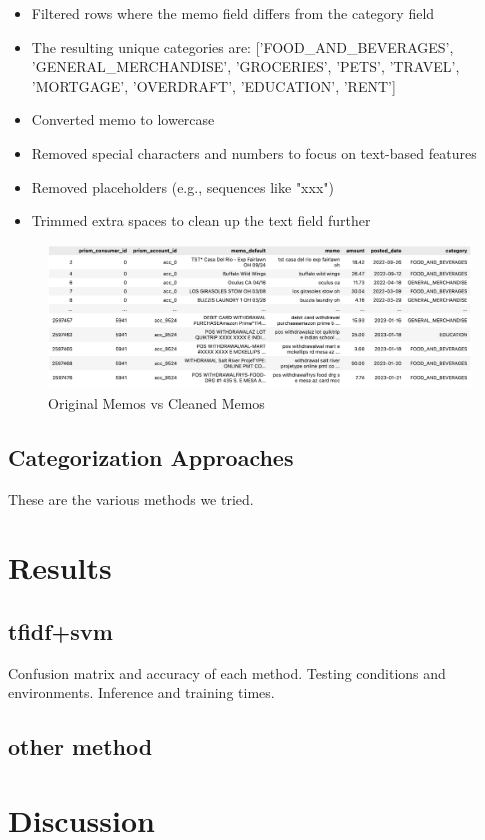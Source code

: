 \documentclass[12pt,letterpaper]{article}
\begin{document}
\begin{itemize}
    \item Filtered rows where the memo field differs from the category field 
    \item The resulting unique categories are: ['FOOD\_AND\_BEVERAGES', 'GENERAL\_MERCHANDISE', 'GROCERIES', 'PETS', 'TRAVEL', 'MORTGAGE', 'OVERDRAFT', 'EDUCATION', 'RENT']
    \item Converted memo to lowercase
    \item Removed special characters and numbers to focus on text-based features
    \item Removed placeholders (e.g., sequences like "xxx")
    \item Trimmed extra spaces to clean up the text field further
\end{itemize}
\begin{figure}[H]
    \centering
    \includegraphics[width=1.0\textwidth]{pngs/memo_clean.png}
    \caption{Original Memos vs Cleaned Memos}
    \label{fig:enter-label}
\end{figure}

\subsection{Categorization Approaches}
These are the various methods we tried.

\section{Results}
\subsection{tfidf+svm}
Confusion matrix and accuracy of each method. Testing conditions and environments. Inference and training times.
\subsection{other method}

\section{Discussion}
\end{document}
